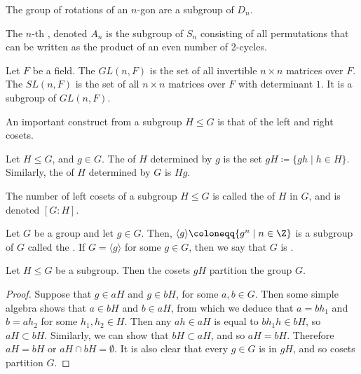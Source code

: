 \documentclass[12pt]{report}
\begin{document}
\begin{example}
  The group of rotations of an \(n\)-gon are a subgroup of \(D_{n}\).
\end{example}


\begin{example}
  The \(n\)-th , denoted \(A_{n}\) is the subgroup of \(S_{n}\) consisting of all permutations that can be written as the product of an even number of 2-cycles.
\end{example}

\begin{example}
  Let \(F\) be a field.
  The  \(GL(n, F)\) is the set of all invertible \(n \times n\) matrices over \(F\).
  The  \(SL(n, F)\) is the set of all \(n \times n\) matrices over \(F\) with determinant \(1\).
  It is a subgroup of \(GL(n, F)\).
\end{example}


An important construct from a subgroup \(H \leq G\) is that of the left and right cosets.

\begin{definition}\label{def:group-theory:coset}
  Let \(H \leq G\), and \(g \in G\).
  The  of \(H\) determined by \(g\) is the set \(gH \coloneqq \{gh \mid h \in H\}\).
  Similarly, the  of \(H\) determined by \(G\) is \(Hg\).


  The number of left cosets of a subgroup \(H \leq G\) is called the  of \(H\) in \(G\), and is denoted \([G : H]\).
\end{definition}

\begin{example}
  Let \(G\) be a group and let \(g \in G\).
  Then, \(\langle g \rangle \coloneqq \{g^{n} \mid n \in \Z\}\) is a subgroup of \(G\) called the .
  If \(G = \langle g \rangle\) for some \(g \in G\), then we say that \(G\) is .
\end{example}

\begin{lemma}
  \label{lem:group-theory:cosets-partition-a-group}
  Let \(H \leq G\) be a subgroup. Then the cosets \(gH\) partition the group \(G\).
\end{lemma}

\begin{proof}
  Suppose that \(g \in aH\) and \(g \in bH\), for some \(a, b \in G\).
  Then some simple algebra shows that \(a \in bH\) and \(b \in aH\), from which we deduce that \(a = b h_{1}\) and \(b = a h_{2}\) for some \(h_{1}, h_{2} \in H\).
  Then any \(ah \in aH\) is equal to \(bh_{1}h \in bH\), so \(aH \subset bH\).
  Similarly, we can show that \(bH \subset aH\), and so \(aH = bH\).
  Therefore \(aH = bH\) or \(aH \cap bH = \emptyset\).
  It is also clear that every \(g \in G\) is in \(gH\), and so cosets partition \(G\).
\end{proof}
\end{document}
